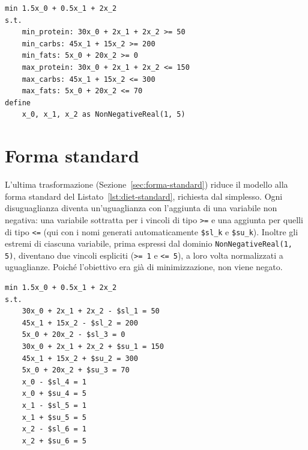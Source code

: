 \begin{lstlisting}[language=rooc, caption={Il \texttt{LinearModel} dopo la linearizzazione.}, label={lst:diet-linear}]
min 1.5x_0 + 0.5x_1 + 2x_2
s.t.
    min_protein: 30x_0 + 2x_1 + 2x_2 >= 50
    min_carbs: 45x_1 + 15x_2 >= 200
    min_fats: 5x_0 + 20x_2 >= 0
    max_protein: 30x_0 + 2x_1 + 2x_2 <= 150
    max_carbs: 45x_1 + 15x_2 <= 300
    max_fats: 5x_0 + 20x_2 <= 70
define
    x_0, x_1, x_2 as NonNegativeReal(1, 5)
\end{lstlisting}

\section{Forma standard}
\label{app:diet-standard}

L'ultima trasformazione (Sezione~\ref{sec:forma-standard}) riduce il modello alla
forma standard del Listato~\ref{lst:diet-standard}, richiesta dal simplesso. Ogni
disuguaglianza diventa un'uguaglianza con l'aggiunta di una variabile non
negativa: una variabile sottratta per i vincoli di tipo \texttt{>=} e una aggiunta
per quelli di tipo \texttt{<=} (qui con i nomi generati automaticamente
\texttt{\$sl\_k} e \texttt{\$su\_k}). Inoltre gli estremi di ciascuna variabile,
prima espressi dal dominio \texttt{NonNegativeReal(1, 5)}, diventano due vincoli
espliciti (\texttt{>= 1} e \texttt{<= 5}), a loro volta normalizzati a uguaglianze.
Poiché l'obiettivo era già di minimizzazione, non viene negato.

\begin{lstlisting}[language=rooc, caption={Il modello in forma standard.}, label={lst:diet-standard}]
min 1.5x_0 + 0.5x_1 + 2x_2
s.t.
    30x_0 + 2x_1 + 2x_2 - $sl_1 = 50
    45x_1 + 15x_2 - $sl_2 = 200
    5x_0 + 20x_2 - $sl_3 = 0
    30x_0 + 2x_1 + 2x_2 + $su_1 = 150
    45x_1 + 15x_2 + $su_2 = 300
    5x_0 + 20x_2 + $su_3 = 70
    x_0 - $sl_4 = 1
    x_0 + $su_4 = 5
    x_1 - $sl_5 = 1
    x_1 + $su_5 = 5
    x_2 - $sl_6 = 1
    x_2 + $su_6 = 5
\end{lstlisting}
